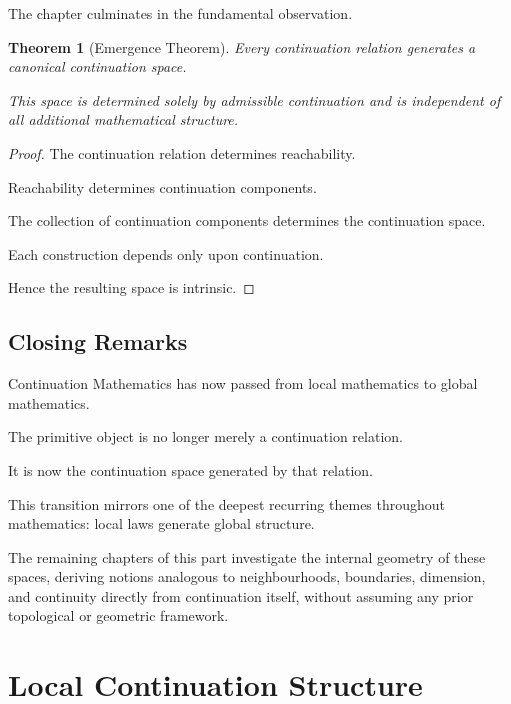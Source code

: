 \documentclass[13pt,openany]{book}
\theoremstyle{plain}
\newtheorem{theorem}{Theorem}[chapter]
\theoremstyle{definition}
\begin{document}
The chapter culminates in the fundamental observation.

\begin{theorem}[Emergence Theorem]

Every continuation relation generates a canonical continuation space.

This space is determined solely by admissible continuation and is independent of
all additional mathematical structure.

\end{theorem}

\begin{proof}

The continuation relation determines reachability.

Reachability determines continuation components.

The collection of continuation components determines the continuation space.

Each construction depends only upon continuation.

Hence the resulting space is intrinsic.

\end{proof}


\section*{Closing Remarks}

Continuation Mathematics has now passed from local mathematics to global
mathematics.

The primitive object is no longer merely a continuation relation.

It is now the continuation space generated by that relation.

This transition mirrors one of the deepest recurring themes throughout
mathematics: local laws generate global structure.

The remaining chapters of this part investigate the internal geometry of these
spaces, deriving notions analogous to neighbourhoods, boundaries, dimension,
and continuity directly from continuation itself, without assuming any prior
topological or geometric framework.

\chapter{Local Continuation Structure}
\end{document}
